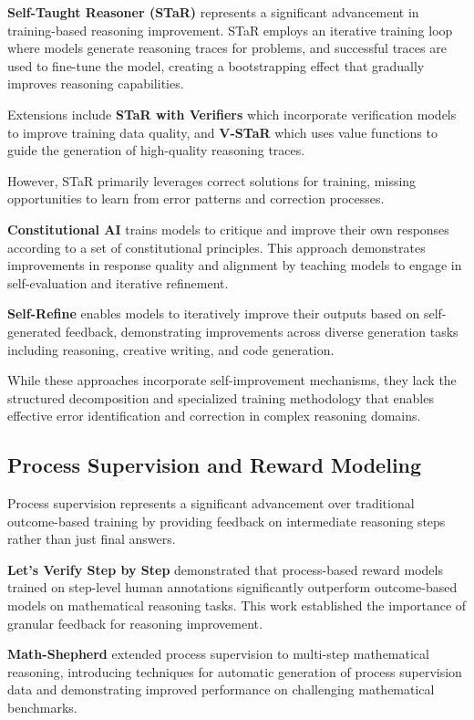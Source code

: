 \documentclass[10pt,twocolumn]{article}
\begin{document}
\textbf{Self-Taught Reasoner (STaR)} represents a significant advancement in training-based reasoning improvement. STaR employs an iterative training loop where models generate reasoning traces for problems, and successful traces are used to fine-tune the model, creating a bootstrapping effect that gradually improves reasoning capabilities.

Extensions include \textbf{STaR with Verifiers} which incorporate verification models to improve training data quality, and \textbf{V-STaR} which uses value functions to guide the generation of high-quality reasoning traces.

However, STaR primarily leverages correct solutions for training, missing opportunities to learn from error patterns and correction processes.

\textbf{Constitutional AI} trains models to critique and improve their own responses according to a set of constitutional principles. This approach demonstrates improvements in response quality and alignment by teaching models to engage in self-evaluation and iterative refinement.

\textbf{Self-Refine} enables models to iteratively improve their outputs based on self-generated feedback, demonstrating improvements across diverse generation tasks including reasoning, creative writing, and code generation.

While these approaches incorporate self-improvement mechanisms, they lack the structured decomposition and specialized training methodology that enables effective error identification and correction in complex reasoning domains.

\subsection{Process Supervision and Reward Modeling}

Process supervision represents a significant advancement over traditional outcome-based training by providing feedback on intermediate reasoning steps rather than just final answers.

\textbf{Let's Verify Step by Step} demonstrated that process-based reward models trained on step-level human annotations significantly outperform outcome-based models on mathematical reasoning tasks. This work established the importance of granular feedback for reasoning improvement.

\textbf{Math-Shepherd} extended process supervision to multi-step mathematical reasoning, introducing techniques for automatic generation of process supervision data and demonstrating improved performance on challenging mathematical benchmarks.
\end{document}
